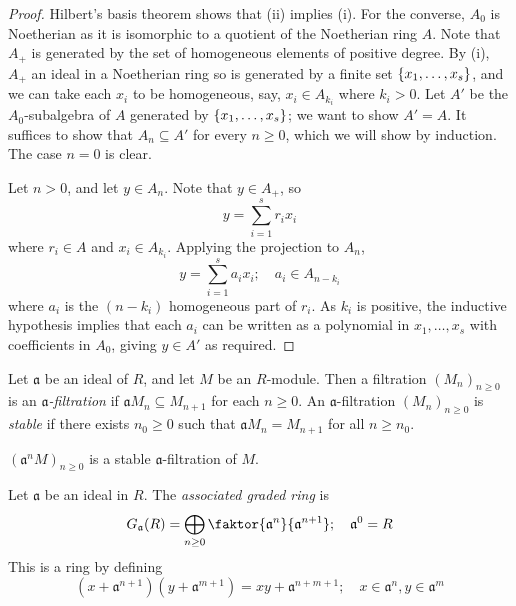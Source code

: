 \begin{proof}
    Hilbert's basis theorem shows that (ii) implies (i).
    For the converse, \( A_0 \) is Noetherian as it is isomorphic to a quotient of the Noetherian ring \( A \).
    Note that \( A_+ \) is generated by the set of homogeneous elements of positive degree.
    By (i), \( A_+ \) an ideal in a Noetherian ring so is generated by a finite set \( \qty{x_1, \dots, x_s} \), and we can take each \( x_i \) to be homogeneous, say, \( x_i \in A_{k_i} \) where \( k_i > 0 \).
    Let \( A' \) be the \( A_0 \)-subalgebra of \( A \) generated by \( \qty{x_1, \dots, x_s} \); we want to show \( A' = A \).
    It suffices to show that \( A_n \subseteq A' \) for every \( n \geq 0 \), which we will show by induction.
    The case \( n = 0 \) is clear.

    Let \( n > 0 \), and let \( y \in A_n \).
    Note that \( y \in A_+ \), so
    \[ y = \sum_{i=1}^s r_i x_i \]
    where \( r_i \in A \) and \( x_i \in A_{k_i} \).
    Applying the projection to \( A_n \),
    \[ y = \sum_{i=1}^s a_i x_i;\quad a_i \in A_{n-k_i} \]
    where \( a_i \) is the \( (n-k_i) \) homogeneous part of \( r_i \).
    As \( k_i \) is positive, the inductive hypothesis implies that each \( a_i \) can be written as a polynomial in \( x_1, \dots, x_s \) with coefficients in \( A_0 \), giving \( y \in A' \) as required.
\end{proof}
\begin{definition}
    Let \( \mathfrak a \) be an ideal of \( R \), and let \( M \) be an \( R \)-module.
    Then a filtration \( (M_n)_{n \geq 0} \) is an \emph{\( \mathfrak a \)-filtration} if \( \mathfrak a M_n \subseteq M_{n+1} \) for each \( n \geq 0 \).
    An \( \mathfrak a \)-filtration \( (M_n)_{n \geq 0} \) is \emph{stable} if there exists \( n_0 \geq 0 \) such that \( \mathfrak a M_n = M_{n+1} \) for all \( n \geq n_0 \).
\end{definition}
\begin{example}
    \( (\mathfrak a^n M)_{n \geq 0} \) is a stable \( \mathfrak a \)-filtration of \( M \).
\end{example}
\begin{definition}
    Let \( \mathfrak a \) be an ideal in \( R \).
    The \emph{associated graded ring} is
    \[ G_{\mathfrak a}(R) = \bigoplus_{n \geq 0} \faktor{\mathfrak a^n}{\mathfrak a^{n+1}};\quad \mathfrak a^0 = R \]
    This is a ring by defining
    \[ (x + \mathfrak a^{n+1})(y + \mathfrak a^{m+1}) = xy + \mathfrak a^{n + m + 1};\quad x \in \mathfrak a^n, y \in \mathfrak a^m \]
\end{definition}
